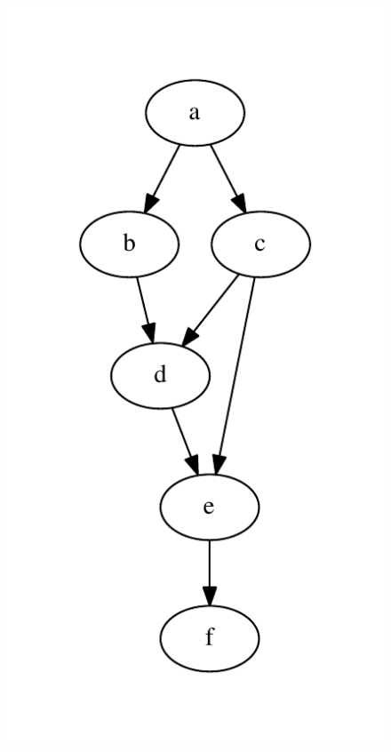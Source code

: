 \documentclass[12pt,a4paper]{article}
\begin{document}
\begin{figure}[ht]
{        \includegraphics[scale=0.5]{directed.pdf}
        \label{fig:exemplo-grafo-direcionado}
    }    
    \subfloat[][ponderado] {
}
\end{figure}
\end{document}
